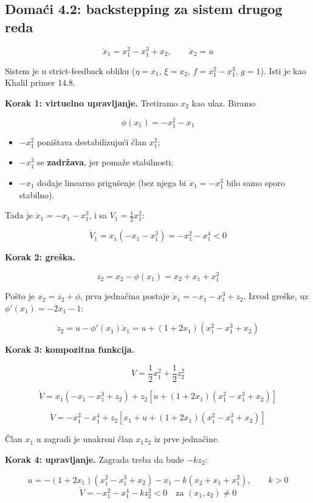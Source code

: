 \documentclass[11pt,a4paper,parskip=half,headsepline,numbers=noenddot]{scrartcl}
\begin{document}
\subsection{Domaći 4.2: backstepping za sistem drugog reda}

\[\dot x_1 = x_1^2 - x_1^3 + x_2, \qquad \dot x_2 = u\]

Sistem je u strict-feedback obliku (\(\eta = x_1\), \(\xi = x_2\), \(f = x_1^2 - x_1^3\), \(g = 1\)). Isti je kao Khalil primer 14.8.

\textbf{Korak 1: virtuelno upravljanje.} Tretiramo \(x_2\) kao ulaz. Biramo

\[\phi(x_1) = -x_1^2 - x_1\]

\begin{itemize}
\item \(-x_1^2\) poništava destabilizujući član \(x_1^2\);
\item \(-x_1^3\) se \textbf{zadržava}, jer pomaže stabilnosti;
\item \(-x_1\) dodaje linearno prigušenje (bez njega bi \(\dot x_1 = -x_1^3\) bilo samo sporo stabilno).
\end{itemize}

Tada je \(\dot x_1 = -x_1 - x_1^3\), i sa \(V_1 = \frac12x_1^2\):

\[\dot V_1 = x_1(-x_1 - x_1^3) = -x_1^2 - x_1^4 < 0\]

\textbf{Korak 2: greška.}

\[z_2 = x_2 - \phi(x_1) = x_2 + x_1 + x_1^2\]

Pošto je \(x_2 = z_2 + \phi\), prva jednačina postaje \(\dot x_1 = -x_1 - x_1^3 + z_2\). Izvod greške, uz \(\phi'(x_1) = -2x_1 - 1\):

\[\dot z_2 = u - \phi'(x_1)\dot x_1 = u + (1 + 2x_1)(x_1^2 - x_1^3 + x_2)\]

\textbf{Korak 3: kompozitna funkcija.}

\[V = \frac12x_1^2 + \frac12z_2^2\]

\[\dot V = x_1(-x_1 - x_1^3 + z_2) + z_2\left[u + (1 + 2x_1)(x_1^2 - x_1^3 + x_2)\right]\]

\[\dot V = -x_1^2 - x_1^4 + z_2\left[x_1 + u + (1 + 2x_1)(x_1^2 - x_1^3 + x_2)\right]\]

Član \(x_1\) u zagradi je unakrsni član \(x_1z_2\) iz prve jednačine.

\textbf{Korak 4: upravljanje.} Zagrada treba da bude \(-kz_2\):

\begin{kljucna}
\[u = -(1 + 2x_1)(x_1^2 - x_1^3 + x_2) - x_1 - k(x_2 + x_1 + x_1^2), \qquad k > 0\]
\[\dot V = -x_1^2 - x_1^4 - kz_2^2 < 0 \quad \text{za } (x_1, z_2) \ne 0\]
\end{kljucna}
\end{document}
